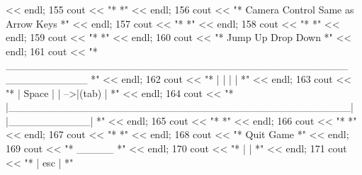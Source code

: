 \begin{DoxyCode}
      << endl;
155         cout << \textcolor{stringliteral}{"*                                                                                      *"} 
      << endl;
156         cout << \textcolor{stringliteral}{"*                          Camera Control Same as Arrow Keys                           *"} 
      << endl;
157         cout << \textcolor{stringliteral}{"*                                                                                      *"} 
      << endl;
158         cout << \textcolor{stringliteral}{"*                                                                                      *"} 
      << endl;
159         cout << \textcolor{stringliteral}{"*                                                                                      *"} 
      << endl;
160         cout << \textcolor{stringliteral}{"*                               Jump Up                         Drop Down              *"} 
      << endl;
161         cout << \textcolor{stringliteral}{"*           \_\_\_\_\_\_\_\_\_\_\_\_\_\_\_\_\_\_\_\_\_\_\_\_\_\_\_\_\_\_\_\_\_\_\_\_\_\_\_\_\_\_\_\_\_\_     \_\_\_\_\_\_\_\_\_\_\_             *"} 
      << endl;
162         cout << \textcolor{stringliteral}{"*          |                                              |   |           |            *"} 
      << endl;
163         cout << \textcolor{stringliteral}{"*          |                     Space                    |   | -->|(tab) |            *"} 
      << endl;
164         cout << \textcolor{stringliteral}{"*          |\_\_\_\_\_\_\_\_\_\_\_\_\_\_\_\_\_\_\_\_\_\_\_\_\_\_\_\_\_\_\_\_\_\_\_\_\_\_\_\_\_\_\_\_\_\_|   |\_\_\_\_\_\_\_\_\_\_\_|            *"} 
      << endl;
165         cout << \textcolor{stringliteral}{"*                                                                                      *"} 
      << endl;
166         cout << \textcolor{stringliteral}{"*                                                                                      *"} 
      << endl;
167         cout << \textcolor{stringliteral}{"*                                                                                      *"} 
      << endl;
168         cout << \textcolor{stringliteral}{"*                                       Quit Game                                      *"} 
      << endl;
169         cout << \textcolor{stringliteral}{"*                                         \_\_\_\_\_                                        *"} 
      << endl;
170         cout << \textcolor{stringliteral}{"*                                        |     |                                       *"} 
      << endl;
171         cout << \textcolor{stringliteral}{"*                                        | esc |                                       *"} 

\end{DoxyCode}
